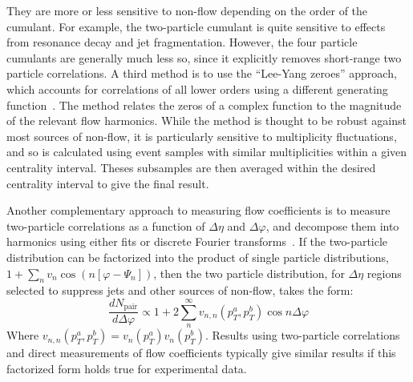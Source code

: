 They are more or less sensitive to non-flow depending on the order of the cumulant.  For example, the two-particle
cumulant is quite sensitive to effects from resonance decay and jet fragmentation.  However, the four particle
cumulants are generally much less so, since it explicitly removes short-range two particle correlations.
%
A third method is to use the ``Lee-Yang zeroes'' approach, which accounts for correlations of all lower orders using a
different generating function~\cite{Bhalerao:2003yq,Borghini:2004ke}.  
The method relates the zeros of a complex function to the magnitude of the relevant
flow harmonics.  While the method is thought to be robust against most sources of non-flow, it is particularly sensitive to
multiplicity fluctuations, and so is calculated using event samples with similar multiplicities within a given
centrality interval.  Theses subsamples are then averaged within the desired centrality interval to give the final result.

Another complementary approach to measuring flow coefficients is to
measure two-particle correlations as a function of $\Delta\eta$ and
$\Delta\varphi$, and decompose them into harmonics using either fits
or discrete Fourier
transforms~\cite{ATLAS:2012at,Aamodt:2011by,ALICE:2011ab}.  If
the two-particle distribution can be factorized into the product of
single particle distributions, $1+\sum_n v_n \cos(n[\varphi-\Psi_n])$,
then the two particle distribution, for $\Delta\eta$ regions selected
to suppress jets and other sources of non-flow, takes the form:
\begin{equation}
\frac{dN_{\mathrm{pair}}}{d\Delta\varphi} \propto 1 + 2 \sum_n^{\infty} v_{n,n}(p_T^a,p_T^b) \cos n\Delta\varphi
\end{equation}
Where $v_{n,n}(p_T^a,p_T^b) = v_n(p_T^a) v_n(p_T^b)$.  Results using
two-particle correlations and direct measurements of flow coefficients
typically give similar results if this factorized form holds true for
experimental data.


